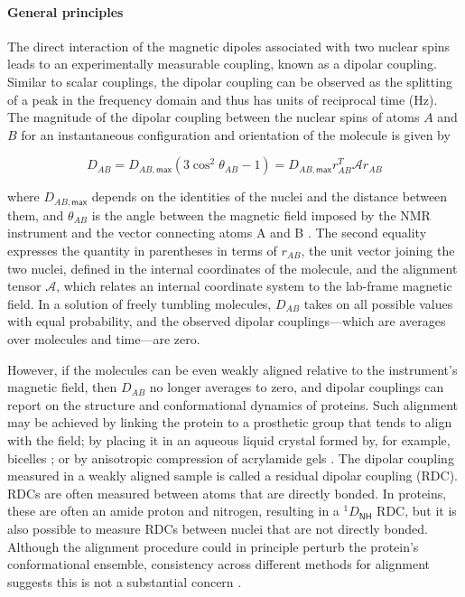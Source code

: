 \documentclass[9pt,review]{livecoms}
\begin{document}
\paragraph{General principles}

The direct interaction of the magnetic dipoles associated with two nuclear spins leads to an experimentally measurable coupling, known as a dipolar coupling.
Similar to scalar couplings, the dipolar coupling can be observed as the splitting of a peak in the frequency domain and thus has units of reciprocal time (Hz).
The magnitude of the dipolar coupling between the nuclear spins of atoms $A$ and $B$ for an instantaneous configuration and orientation of the molecule is given by

\begin{equation}
\label{eqn:rdc}
D_{AB} = D_{AB,\mathsf{max}} \left( 3 \cos^2 \theta_{AB} - 1 \right) = D_{AB,\mathsf{max}} r_{AB}^T \mathcal{A} r_{AB}
\end{equation}

\noindent where $D_{AB,\mathsf{max}}$ depends on the identities of the nuclei and the distance between them, and $\theta_{AB}$ is the angle between the magnetic field imposed by the NMR instrument and the vector connecting atoms A and B \cite{bax2001dipolar,bax2003weak,chiliveri2021advances}.
The second equality expresses the quantity in parentheses in terms of $r_{AB}$, the unit vector joining the two nuclei, defined in the internal coordinates of the molecule, and the alignment tensor $\mathcal{A}$, which relates an internal coordinate system to the lab-frame magnetic field.
In a solution of freely tumbling molecules, $D_{AB}$ takes on all possible values with equal probability, and the observed dipolar couplings---which are averages over molecules and time---are zero.

However, if the molecules can be even weakly aligned relative to the instrument’s magnetic field, then $D_{AB}$ no longer averages to zero, and dipolar couplings can report on the structure and conformational dynamics of proteins.
Such alignment may be achieved by linking the protein to a prosthetic group that tends to align with the field; by placing it in an aqueous liquid crystal formed by, for example, bicelles \cite{sanders_magnetically_1990,prosser_magnetically_1998}; or by anisotropic compression of acrylamide gels \cite{tycko_alignment_2000}.
The dipolar coupling measured in a weakly aligned sample is called a residual dipolar coupling (RDC).
RDCs are often measured between atoms that are directly bonded.
In proteins, these are often an amide proton and nitrogen, resulting in a $^1D_{\mathsf{NH}}$ RDC, but it is also possible to measure RDCs between nuclei that are not directly bonded.
Although the alignment procedure could in principle perturb the protein’s conformational ensemble, consistency across different methods for alignment suggests this is not a substantial concern \cite{lakomek2008self}.
\end{document}
